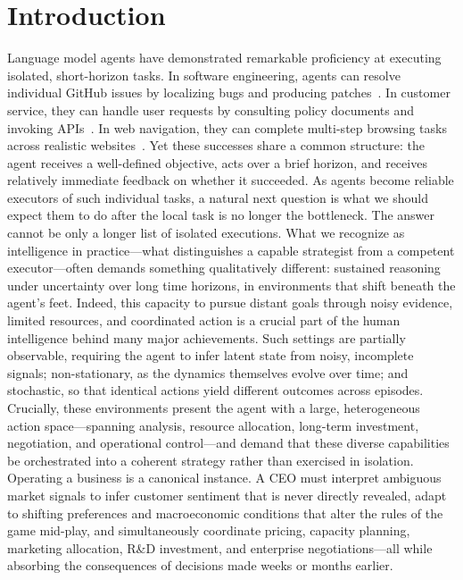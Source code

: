 \section{Introduction}

Language model agents have demonstrated remarkable proficiency at executing isolated, short-horizon tasks.
In software engineering, agents can resolve individual GitHub issues by localizing bugs and producing patches~\citep{jimenez2024swebench}.
In customer service, they can handle user requests by consulting policy documents and invoking APIs~\citep{yao2024taubench}.
In web navigation, they can complete multi-step browsing tasks across realistic websites~\citep{zhou2024webarena}.
Yet these successes share a common structure: the agent receives a well-defined objective, acts over a brief horizon, and receives relatively immediate feedback on whether it succeeded.
%
As agents become reliable executors of such individual tasks, a natural next question is what we should expect them to do after the local task is no longer the bottleneck.
The answer cannot be only a longer list of isolated executions.
%
What we recognize as intelligence in practice---what distinguishes a capable strategist from a competent executor---often demands something qualitatively different: sustained reasoning under uncertainty over long time horizons, in environments that shift beneath the agent's feet.
Indeed, this capacity to pursue distant goals through noisy evidence, limited resources, and coordinated action is a crucial part of the human intelligence behind many major achievements.
%
Such settings are partially observable, requiring the agent to infer latent state from noisy, incomplete signals; non-stationary, as the dynamics themselves evolve over time; and stochastic, so that identical actions yield different outcomes across episodes.
%
Crucially, these environments present the agent with a large, heterogeneous action space---spanning analysis, resource allocation, long-term investment, negotiation, and operational control---and demand that these diverse capabilities be orchestrated into a coherent strategy rather than exercised in isolation.
%
Operating a business is a canonical instance.
A CEO must interpret ambiguous market signals to infer customer sentiment that is never directly revealed, adapt to shifting preferences and macroeconomic conditions that alter the rules of the game mid-play, and simultaneously coordinate pricing, capacity planning, marketing allocation, R\&D investment, and enterprise negotiations---all while absorbing the consequences of decisions made weeks or months earlier.

